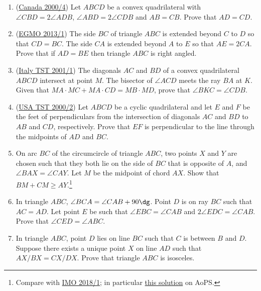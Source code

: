 \documentclass[11pt,paper=letter]{scrartcl}
\begin{document}
\begin{enumerate}
  \item (\href{https://aops.com/community/c6h77707}{Canada 2000/4}) Let $ABCD$ be a convex quadrilateral with $\angle CBD = 2 \angle ADB$, $\angle ABD = 2 \angle CDB$ and $AB = CB$. Prove that $AD = CD$.

  \item (\href{https://aops.com/community/c6h529042}{EGMO 2013/1}) The side $BC$ of triangle $ABC$ is extended beyond $C$ to $D$ so that $CD = BC$. The side $CA$ is extended beyond $A$ to $E$ so that $AE = 2CA$. Prove that if $AD = BE$ then triangle $ABC$ is right angled.
  
  \item (\href{https://aops.com/community/c6h228384}{Italy TST 2001/1}) The diagonals $ AC$ and $ BD$ of a convex quadrilateral $ ABCD$ intersect at point $ M$. The bisector of $ \angle ACD$ meets the ray $ BA$ at $ K$. Given that $ MA \cdot MC +MA \cdot CD = MB \cdot MD$, prove that $ \angle BKC = \angle CDB$.

  \item (\href{https://aops.com/community/c6h326960}{USA TST 2000/2}) Let $ ABCD$ be a cyclic quadrilateral and let $ E$ and $ F$ be the feet of perpendiculars from the intersection of diagonals $ AC$ and $ BD$ to $ AB$ and $ CD$, respectively. Prove that $ EF$ is perpendicular to the line through the midpoints of $ AD$ and $ BC$.

  \item On arc $BC$ of the circumcircle of triangle $ABC$, two points $X$ and $Y$ are chosen such that they both lie on the side of $BC$ that is opposite of $A$, and $\angle BAX = \angle CAY$. Let $M$ be the midpoint of chord $AX$. Show that $BM + CM \geq AY$.\footnote{Compare with \href{https://aops.com/community/c6h1670580}{IMO 2018/1}; in particular \href{http://artofproblemsolving.com/community/c6h1670580p10626602}{this solution} on AoPS.} %

  \item In triangle $ABC$, $\angle BCA = \angle CAB + 90\dg$. Point $D$ is on ray $BC$ such that $AC = AD$. Let point $E$ be such that $\angle EBC = \angle CAB$ and $2\angle EDC = \angle CAB$. Prove that $\angle CED = \angle ABC$.

  \item In triangle $ABC$, point $D$ lies on line $BC$ such that $C$ is between $B$ and $D$. Suppose there exists a unique point $X$ on line $AD$ such that $AX/BX = CX/DX$. Prove that triangle $ABC$ is isosceles.


\end{enumerate}
\end{document}

